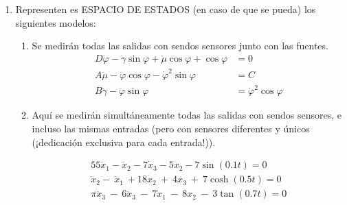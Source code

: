 \documentclass[letterpaper, 12pt]{article}
\begin{document}
\begin{enumerate}
\begin{enumerate}
\end{enumerate}
\item Representen es ESPACIO DE ESTADOS (en caso de que se pueda) los siguientes modelos:
\begin{enumerate}
\item Se medirán todas las salidas con sendos sensores junto con las fuentes.
\begin{equation}
\begin{split}
    D\ddot{\varphi} - \ddot{\gamma}\sin \varphi + \ddot{\mu}\cos \varphi + \cos \varphi &= 0 \\
    A\ddot{\mu} - \ddot{\varphi}\cos \varphi - {\dot{\varphi}}^2\sin \varphi &= C \\
    B\ddot{\gamma} - \ddot{\varphi}\sin \varphi &= {\dot{\varphi}}^2\cos \varphi
\end{split}
\end{equation}









\item Aquí se medirán simultáneamente todas las salidas con sendos sensores, e incluso las mismas entradas (pero con sensores diferentes y únicos (¡dedicación exclusiva para cada entrada!)).

\begin{equation}
\begin{split}
    55\dddot{x}_1-\ddot{x}_2-7\dot{x}_3-5x_2-7\sin(0.1t)=0 \\
    {\dddot{x}}_2-\ {\ddot{x}}_1\ +18{\dot{x}}_2\ +\ 4x_3\ +\ 7\cosh(0.5t)=0 \\
    \pi\dddot{x}_3\ -\ 6\ddot{x}_3\ -\ 7\dot{x}_1\ -\ 8x_2\ -\ 3\tan(0.7t) =0 
\end{split}
\end{equation}


\end{enumerate}
\end{enumerate}
\end{document}
